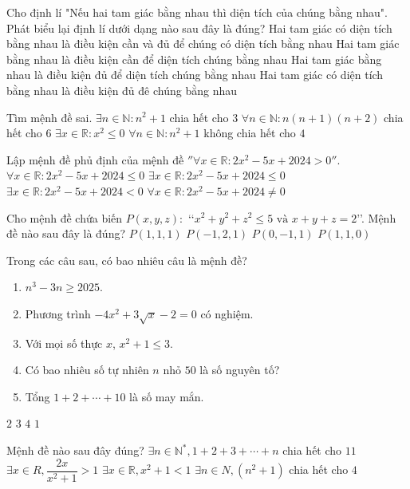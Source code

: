 \begin{ex}
	Cho định lí "Nếu hai tam giác bằng nhau thì diện tích của chúng bằng nhau". Phát biểu lại định lí dưới dạng nào sau đây là đúng?
	\choice
	{Hai tam giác có diện tích bằng nhau là điều kiện cần và đủ để chúng có diện tích bằng nhau}
	{Hai tam giác bằng nhau là điều kiện cần để diện tích chúng bằng nhau}
	{Hai tam giác bằng nhau là điều kiện đủ để diện tích chúng bằng nhau}
	{Hai tam giác có diện tích bằng nhau là điều kiện đủ đê chúng bằng nhau	}
\end{ex}
\begin{ex}
	Tìm mệnh đề sai.
	\choice
	{$\exists n\in \mathbb{N}\colon n^2+1$ chia hết cho $3$}
	{$\forall n\in \mathbb{N}\colon n(n+1)(n+2)$ chia hết cho $6$}
	{$\exists x\in \mathbb{R}\colon x^2\le 0$}
	{$\forall n\in \mathbb{N}\colon n^2+1$ không chia hết cho $4$}
\end{ex}
\begin{ex}
	Lập mệnh đề phủ định của mệnh đề $''\forall x\in \mathbb{R}\colon 2x^2-5x+2024>0''$.
	\choice
	{$\forall x\in \mathbb{R}\colon 2x^2-5x+2024\le 0$}
	{$\exists x\in \mathbb{R}\colon 2x^2-5x+2024\le 0$}
	{$\exists x\in \mathbb{R}\colon 2x^2-5x+2024<0$}
	{$\forall x\in \mathbb{R}\colon 2x^2-5x+2024\ne 0$
	}
\end{ex}
\begin{ex}
	Cho mệnh đề chứa biến $P\left(x,y,z\right)\colon$ \lq\lq$x^2+y^2+z^2\le 5 \text{ và }x+y+z=2$\rq\rq. Mệnh đề nào sau đây là đúng?
	\choice
	{$P\left(1{,}1,1\right)$}
	{$P\left(-1{,}2,1\right)$}
	{$P\left(0,-1{,}1\right)$}
	{$P\left(1{,}1,0\right)$
	}
\end{ex}
\begin{ex}
	Trong các câu sau, có bao nhiêu câu là mệnh đề?
	\begin{enumerate}
		\item $n^3-3n\ge 2025$.
		\item Phương trình $-4x^2+3\sqrt{x}-2=0$ có nghiệm.
		\item Với mọi số thực $x$, $x^2+1\le 3$.
		\item Có bao nhiêu số tự nhiên $n$ nhỏ $50$ là số nguyên tố?
		\item Tổng $1+2+\cdots+10$ là số may mắn.
	\end{enumerate}
	\choice
	{$2$}
	{$3$}
	{$4$}
	{$1$}
\end{ex}
\begin{ex}
	Mệnh đề nào sau đây đúng?
	\choice
	{$\exists n\in \mathbb{N}^*,1+2+3+ \cdots+n$ chia hết cho $11$}
	{$\exists x\in R,\dfrac{2x}{x^2+1}>1$}
	{$\exists x\in \mathbb{R},x^2+1<1$}
	{$\exists n\in N,\left(n^2+1\right)$ chia hết cho $4$	}
\end{ex}

